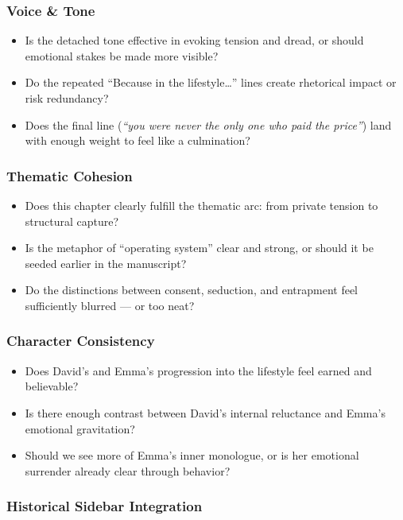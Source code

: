 \subsubsection*{Voice \& Tone}

\begin{itemize}
  \item Is the detached tone effective in evoking tension and dread, or should emotional stakes be made more visible?
  \item Do the repeated ``Because in the lifestyle…'' lines create rhetorical impact or risk redundancy?
  \item Does the final line (\textit{“you were never the only one who paid the price”}) land with enough weight to feel like a culmination?
\end{itemize}

\subsubsection*{Thematic Cohesion}

\begin{itemize}
  \item Does this chapter clearly fulfill the thematic arc: from private tension to structural capture?
  \item Is the metaphor of ``operating system'' clear and strong, or should it be seeded earlier in the manuscript?
  \item Do the distinctions between consent, seduction, and entrapment feel sufficiently blurred — or too neat?
\end{itemize}

\subsubsection*{Character Consistency}

\begin{itemize}
  \item Does David’s and Emma’s progression into the lifestyle feel earned and believable?
  \item Is there enough contrast between David’s internal reluctance and Emma’s emotional gravitation?
  \item Should we see more of Emma’s inner monologue, or is her emotional surrender already clear through behavior?
\end{itemize}

\subsubsection*{Historical Sidebar Integration}

